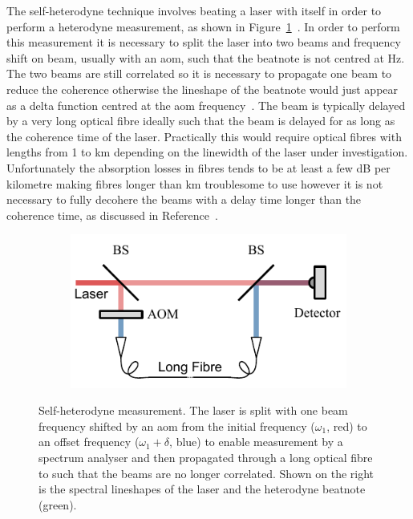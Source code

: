 The self-heterodyne technique involves beating a laser with itself in order to perform a heterodyne measurement, as shown in Figure~\ref{figure:self_heterodyne}~\cite{okoshi_novel_1980}.
In order to perform this measurement it is necessary to split the laser into two beams and frequency shift on beam, usually with an \gls{aom}, such that the beatnote is not centred at \unit[0]{Hz}.
The two beams are still correlated so it is necessary to propagate one beam to reduce the coherence otherwise the lineshape of the beatnote would just appear as a delta function centred at the \gls{aom} frequency~\cite{richter_linewidth_1986}.
The beam is typically delayed by a very long optical fibre ideally such that the beam is delayed for as long as the coherence time of the laser.
Practically this would require optical fibres with lengths from 1 to \unit[100]{km} depending on the linewidth of the laser under investigation.
Unfortunately the absorption losses in fibres tends to be at least a few dB per kilometre making fibres longer than \unit[10]{km} troublesome to use however it is not necessary to fully decohere the beams with a delay time longer than the coherence time, as discussed in Reference~\cite{richter_linewidth_1986}.

\begin{figure}
    \begin{subfigure}{0.49\linewidth}
    \includegraphics{part1/Figs/SelfHeterodyne.pdf}
    \end{subfigure}
    \begin{subfigure}{0.49\linewidth}
    
    \end{subfigure}
    \caption[Self-heterodyne measurement.]{Self-heterodyne measurement. The laser is split with one beam frequency shifted by an \gls{aom} from the initial frequency ($\omega_1$, red) to an offset frequency ($\omega_1+\delta$, blue) to enable measurement by a spectrum analyser and then propagated through a long optical fibre to such that the beams are no longer correlated. Shown on the right is the spectral lineshapes of the laser and the heterodyne beatnote (green).}
    \label{figure:self_heterodyne}
\end{figure}

